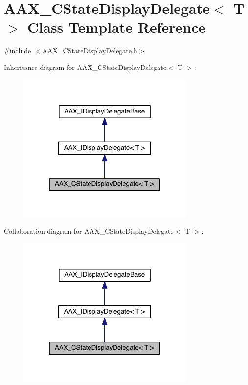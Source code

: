 \hypertarget{a00039}{}\section{A\+A\+X\+\_\+\+C\+State\+Display\+Delegate$<$ T $>$ Class Template Reference}
\label{a00039}


{\ttfamily \#include $<$A\+A\+X\+\_\+\+C\+State\+Display\+Delegate.\+h$>$}



Inheritance diagram for A\+A\+X\+\_\+\+C\+State\+Display\+Delegate$<$ T $>$\+:
\nopagebreak
\begin{figure}[H]
\begin{center}
\leavevmode
\includegraphics[width=249pt]{a00464}
\end{center}
\end{figure}


Collaboration diagram for A\+A\+X\+\_\+\+C\+State\+Display\+Delegate$<$ T $>$\+:
\nopagebreak
\begin{figure}[H]
\begin{center}
\leavevmode
\includegraphics[width=249pt]{a00465}
\end{center}
\end{figure}


